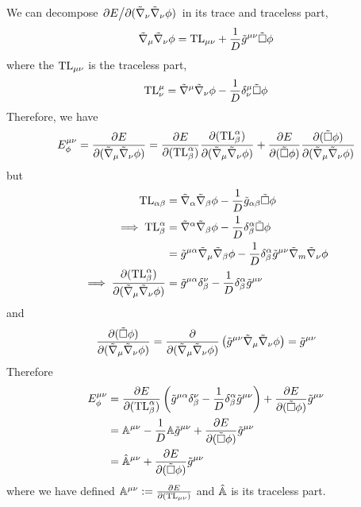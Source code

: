 We can decompose $\pdv*{E}{(\tilde{\nabla}_\nu\tilde{\nabla}_\nu\phi )}$ in its trace and traceless part,
\begin{align}
  \tilde{\nabla}_\mu\tilde{\nabla}_\nu\phi =\text{TL}_{\mu\nu }+\frac{1}{D}\tilde{g}^{\mu\nu }\tilde{\Box}\phi 
\end{align}
where the $\text{TL}_{\mu\nu }$ is the traceless part,
\begin{equation}
  \text{TL}^\mu_\nu =\tilde{\nabla}^\mu\tilde{\nabla}_\nu\phi -\frac{1}{D}\delta^\mu_\nu \tilde{\Box}\phi 
\end{equation}
Therefore, we have
\begin{align}
  E^{\mu\nu }_\phi =\pdv{E}{(\tilde{\nabla}_\mu\tilde{\nabla}_\nu\phi)}=\pdv{E}{(\text{TL}^\alpha_\beta) }\pdv{(\text{TL}^\alpha_\beta)}{(\tilde{\nabla}_\mu\tilde{\nabla}_\nu\phi)}+\pdv{E}{(\tilde{\Box}\phi)}\pdv{(\tilde{\Box}\phi)}{(\tilde{\nabla}_\mu\tilde{\nabla}_\nu\phi)}
\end{align}
but
\begin{align}
  \text{TL}_{\alpha\beta }&=\tilde{\nabla}_\alpha\tilde{\nabla}_\beta \phi-\frac{1}{D}\tilde{g}_{\alpha\beta }\tilde{\Box}\phi \\
  \implies \text{TL}^\alpha_\beta &=\tilde{\nabla}^\alpha\tilde{\nabla}_\beta\phi -\frac{1}{D}\delta^\alpha_\beta\tilde{\Box}\phi \\
  &=\tilde{g}^{\mu\alpha }\tilde{\nabla}_\mu\tilde{\nabla}_\beta\phi  -\frac{1}{D}\delta^\alpha_\beta \tilde{g}^{\mu\nu }\tilde{\nabla}_m\tilde{\nabla}_\nu\phi \\
  \implies \pdv{(\text{TL}^\alpha_\beta)}{(\tilde{\nabla}_\mu\tilde{\nabla}_\nu\phi)}&=\tilde{g}^{\mu\alpha }\delta^\nu_\beta -\frac{1}{D}\delta^\alpha_\beta \tilde{g}^{\mu\nu }
\end{align}
and
\begin{equation}
  \pdv{(\tilde{\Box}\phi)}{(\tilde{\nabla}_\mu\tilde{\nabla}_\nu\phi)}=\pdv{(\tilde{\nabla}_\mu\tilde{\nabla}_\nu\phi)}\left(\tilde{g}^{\mu\nu }\tilde{\nabla}_\mu\tilde{\nabla}_\nu\phi \right)=\tilde{g}^{\mu\nu }
\end{equation}
Therefore
\begin{align}
  E^{\mu\nu }_\phi &=\pdv{E}{(\text{TL}^\alpha_\beta)}\left(\tilde{g}^{\mu\alpha }\delta^\nu_\beta -\frac{1}{D}\delta^\alpha_\beta \tilde{g}^{\mu\nu }\right)+\pdv{E}{(\tilde{\Box}\phi)}\tilde{g}^{\mu\nu }\\
  &=\mathbb{A} ^{\mu\nu }-\frac{1}{D}\mathbb{A} \tilde{g}^{\mu\nu }+\pdv{E}{(\tilde{\Box}\phi)}\tilde{g}^{\mu\nu }\\
  &=\hat{\mathbb{A} }^{\mu\nu }+\pdv{E}{(\tilde{\Box}\phi)}\tilde{g}^{\mu\nu }
\end{align}
where we have defined $\mathbb{A}^{\mu\nu } :=\pdv{E}{(\text{TL}_{\mu\nu})}$ and $\hat{\mathbb{A}}$ is its traceless part.

